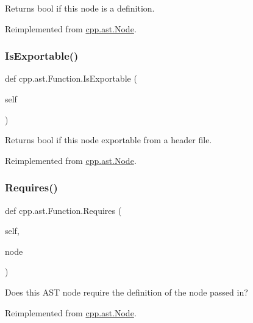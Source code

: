 \begin{DoxyVerb}Returns bool if this node is a definition.\end{DoxyVerb}
 

Reimplemented from \mbox{\hyperlink{classcpp_1_1ast_1_1Node_a684ee9a357168e7e07a24fc6812f66e6}{cpp.\+ast.\+Node}}.

\mbox{\label{classcpp_1_1ast_1_1Function_a85a073cd69116bc6191f379d69d10d72}} 
\subsubsection{\texorpdfstring{IsExportable()}{IsExportable()}}
{\footnotesize\ttfamily def cpp.\+ast.\+Function.\+Is\+Exportable (\begin{DoxyParamCaption}\item[{}]{self }\end{DoxyParamCaption})}

\begin{DoxyVerb}Returns bool if this node exportable from a header file.\end{DoxyVerb}
 

Reimplemented from \mbox{\hyperlink{classcpp_1_1ast_1_1Node_a313273874ccf578485006d4000128234}{cpp.\+ast.\+Node}}.

\mbox{\label{classcpp_1_1ast_1_1Function_a999e7b5e43517cd4d68b1aeea8a7d6e1}} 
\subsubsection{\texorpdfstring{Requires()}{Requires()}}
{\footnotesize\ttfamily def cpp.\+ast.\+Function.\+Requires (\begin{DoxyParamCaption}\item[{}]{self,  }\item[{}]{node }\end{DoxyParamCaption})}

\begin{DoxyVerb}Does this AST node require the definition of the node passed in?\end{DoxyVerb}
 

Reimplemented from \mbox{\hyperlink{classcpp_1_1ast_1_1Node_a31ae211f954a8c578ef16226df5ac8c8}{cpp.\+ast.\+Node}}.



